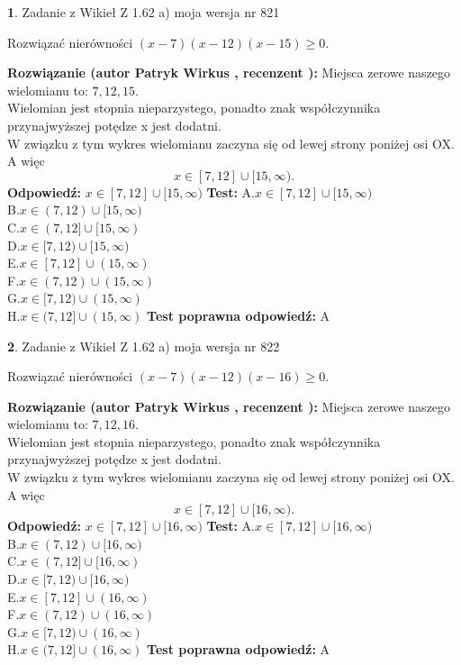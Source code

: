 \documentclass[12pt, a4paper]{article}
\theoremstyle{definition} %
\newtheorem{zad}{}
\newcommand{\zadStart}[1]{\begin{zad}#1\newline}
\newcommand{\zadStop}{\end{zad}}
\newcommand{\rozwStart}[2]{\noindent \textbf{Rozwiązanie (autor #1 , recenzent #2): }\newline}
\newcommand{\rozwStop}{\newline}
\newcommand{\odpStart}{\noindent \textbf{Odpowiedź:}\newline}
\newcommand{\odpStop}{\newline}
\newcommand{\testStart}{\noindent \textbf{Test:}\newline}
\newcommand{\testStop}{\newline}
\newcommand{\kluczStart}{\noindent \textbf{Test poprawna odpowiedź:}\newline}
\newcommand{\kluczStop}{\newline}
\begin{document}
\zadStart{Zadanie z Wikieł Z 1.62 a) moja wersja nr 821}

Rozwiązać nierówności $(x-7)(x-12)(x-15)\ge0$.
\zadStop
\rozwStart{Patryk Wirkus}{}
Miejsca zerowe naszego wielomianu to: $7, 12, 15$.\\
Wielomian jest stopnia nieparzystego, ponadto znak współczynnika przy\linebreak najwyższej potędze x jest dodatni.\\ W związku z tym wykres wielomianu zaczyna się od lewej strony poniżej osi OX. A więc $$x \in [7,12] \cup [15,\infty).$$
\rozwStop
\odpStart
$x \in [7,12] \cup [15,\infty)$
\odpStop
\testStart
A.$x \in [7,12] \cup [15,\infty)$\\
B.$x \in (7,12) \cup [15,\infty)$\\
C.$x \in (7,12] \cup [15,\infty)$\\
D.$x \in [7,12) \cup [15,\infty)$\\
E.$x \in [7,12] \cup (15,\infty)$\\
F.$x \in (7,12) \cup (15,\infty)$\\
G.$x \in [7,12) \cup (15,\infty)$\\
H.$x \in (7,12] \cup (15,\infty)$
\testStop
\kluczStart
A
\kluczStop



\zadStart{Zadanie z Wikieł Z 1.62 a) moja wersja nr 822}

Rozwiązać nierówności $(x-7)(x-12)(x-16)\ge0$.
\zadStop
\rozwStart{Patryk Wirkus}{}
Miejsca zerowe naszego wielomianu to: $7, 12, 16$.\\
Wielomian jest stopnia nieparzystego, ponadto znak współczynnika przy\linebreak najwyższej potędze x jest dodatni.\\ W związku z tym wykres wielomianu zaczyna się od lewej strony poniżej osi OX. A więc $$x \in [7,12] \cup [16,\infty).$$
\rozwStop
\odpStart
$x \in [7,12] \cup [16,\infty)$
\odpStop
\testStart
A.$x \in [7,12] \cup [16,\infty)$\\
B.$x \in (7,12) \cup [16,\infty)$\\
C.$x \in (7,12] \cup [16,\infty)$\\
D.$x \in [7,12) \cup [16,\infty)$\\
E.$x \in [7,12] \cup (16,\infty)$\\
F.$x \in (7,12) \cup (16,\infty)$\\
G.$x \in [7,12) \cup (16,\infty)$\\
H.$x \in (7,12] \cup (16,\infty)$
\testStop
\kluczStart
A
\kluczStop
\end{document}
